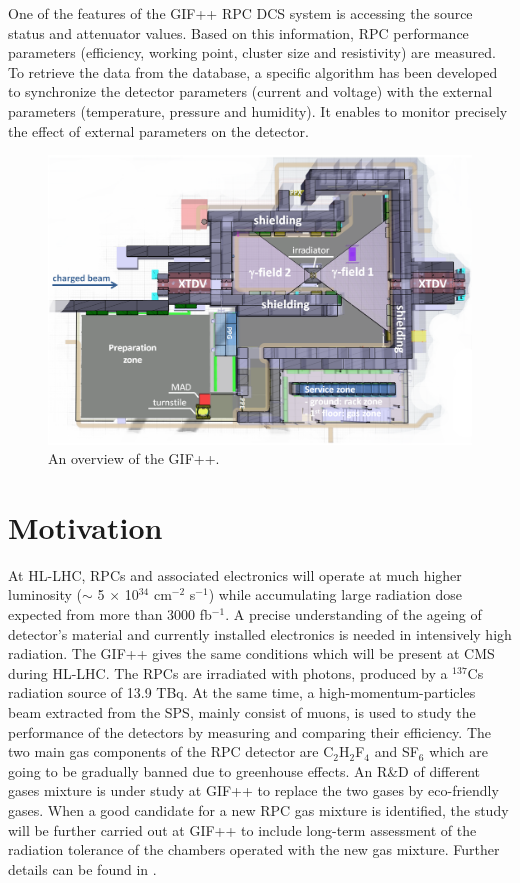 One of the features of the GIF++ RPC DCS system is accessing the source status and attenuator values. Based on this information, RPC performance parameters (efficiency, working point, cluster size and resistivity) are measured. To retrieve the data from the database, a specific algorithm has been developed to synchronize the detector parameters (current and voltage) with the external parameters (temperature, pressure and humidity). It enables to monitor precisely the effect of external parameters on the detector.
\begin{figure}[H]
\centering
\hspace{-0.5cm}
\includegraphics[scale=0.35]{fig/wincc/GIF.png}
 \caption{An overview of the GIF++.}
\label{fig:gif}
\end{figure}
\section{Motivation}\label{sec:gif_motiv}
At HL-LHC, RPCs and associated electronics will operate at much higher luminosity ($\sim$ 5 $\times$ 10$^{34}$ cm$^{-2}$ s$^{-1}$) while accumulating large radiation dose expected from more than 3000 fb$^{-1}$. A precise understanding of the ageing of detector's material and currently installed electronics is needed in intensively high radiation. 
The GIF++ gives the same conditions which will be present at CMS during HL-LHC. The RPCs are irradiated with photons, produced by a $^{137}$Cs radiation source of 13.9 TBq.  At the same time, a high-momentum-particles beam extracted from the SPS, mainly consist of muons, is used to study the performance of the detectors by measuring and comparing their efficiency. The two main gas components of the RPC detector are C$_{2}$H$_{2}$F$_{4}$ and SF$_{6}$ which are going to be gradually banned due to greenhouse effects. An R\&D of different gases mixture is under study at GIF++ to replace the two gases by eco-friendly gases. When a good candidate for a new RPC gas mixture is identified, the study will be further carried out at GIF++ to include long-term assessment of the radiation tolerance of the chambers operated with the new gas mixture. Further details can be found in \cite{phase2}.

